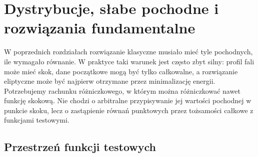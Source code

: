 \chapter[Dystrybucje i słabe pochodne]{Dystrybucje, słabe pochodne i rozwiązania fundamentalne}
\label{chap:pde-distributions}

\providecommand{\atlasref}[2]{#2}

W poprzednich rozdziałach rozwiązanie klasyczne musiało mieć tyle pochodnych,
ile wymagało równanie. W praktyce taki warunek jest często zbyt silny:
profil fali może mieć skok, dane początkowe mogą być tylko całkowalne,
a rozwiązanie eliptyczne może być najpierw otrzymane przez minimalizację
energii. Potrzebujemy rachunku różniczkowego, w którym można różniczkować
nawet funkcję skokową. Nie chodzi o arbitralne przypisywanie jej wartości
pochodnej w punkcie skoku, lecz o zastąpienie równań punktowych przez
tożsamości całkowe z funkcjami testowymi.

\section{Przestrzeń funkcji testowych}
\label{sec:pde7-tests}

